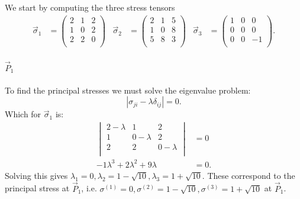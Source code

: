   \begin{derivation}
    We start by computing the three stress tensors
    \begin{align*}
      \Vec{\sigma}_1 &= \begin{pmatrix}
        2 & 1 & 2\\
      1 & 0 & 2\\
      2 & 2 & 0\\
      \end{pmatrix} & \Vec{\sigma}_2 &= \begin{pmatrix}
 2 & 1 & 5 \\
 1 & 0 & 8 \\
 5 & 8 & 3 \\
\end{pmatrix} & \Vec{\sigma}_3 &= \begin{pmatrix}
  1 & 0 & 0\\
0 & 0 & 0\\
  0& 0 & -1\\
\end{pmatrix}
    .\end{align*}

    \paragraph{$\Vec{P}_1$} To find the principal stresses we must solve the eigenvalue problem:
    \begin{equation*}
      \left| \sigma_{ji} - \lambda \delta_{ij} \right| = 0
    .\end{equation*}
    Which for $\Vec{\sigma}_1$ is:
    \begin{align*}
      \begin{vmatrix}
        2 - \lambda & 1 & 2\\
      1 & 0 - \lambda & 2\\
      2 & 2 & 0 - \lambda\\
    \end{vmatrix} &= 0 \\
      -1\lambda ^3+2\lambda ^2+9\lambda &= 0
   .\end{align*}
   Solving this gives $\lambda_1 = 0, \lambda_2 = 1 - \sqrt{10}, \lambda_3 = 1 + \sqrt{10}$. These correspond to the principal stress at $\Vec{P}_1$, i.e. $\sigma^{(1)} = 0, \sigma^{(2)} = 1 - \sqrt{10}, \sigma^{(3)} = 1 + \sqrt{10}$ at $\Vec{P}_1$.


\end{derivation}
